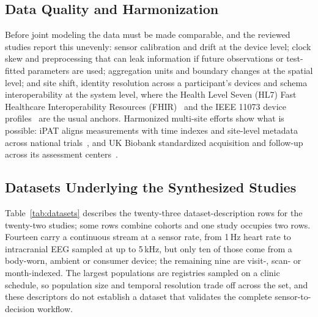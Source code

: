 \documentclass[journal]{IEEEtran}
\begin{document}
\subsection{Data Quality and Harmonization}
Before joint modeling the data must be made comparable, and the reviewed studies report this unevenly: sensor calibration and drift at the device level; clock skew and preprocessing that can leak information if future observations or test-fitted parameters are used; aggregation units and boundary changes at the spatial level; and site shift, identity resolution across a participant's devices and schema interoperability at the system level, where the Health Level Seven (HL7) Fast Healthcare Interoperability Resources (FHIR)~\cite{ayaz2021fhir} and the IEEE 11073 device profiles~\cite{ieee11073std} are the usual anchors. Harmonized multi-site efforts show what is possible: iPAT aligns measurements with time indexes and site-level metadata across national trials~\cite{Fang2021iPAT}, and UK Biobank standardized acquisition and follow-up across its assessment centers~\cite{sudlow2015ukbiobank}.

\subsection{Datasets Underlying the Synthesized Studies}
\label{sec:datasets}

Table~\ref{tab:datasets} describes the twenty-three dataset-description rows for the twenty-two studies; some rows combine cohorts and one study occupies two rows. Fourteen carry a continuous stream at a sensor rate, from 1\,Hz heart rate to intracranial EEG sampled at up to 5\,kHz, but only ten of those come from a body-worn, ambient or consumer device; the remaining nine are visit-, scan- or month-indexed. The largest populations are registries sampled on a clinic schedule, so population size and temporal resolution trade off across the set, and these descriptors do not establish a dataset that validates the complete sensor-to-decision workflow.
\end{document}
